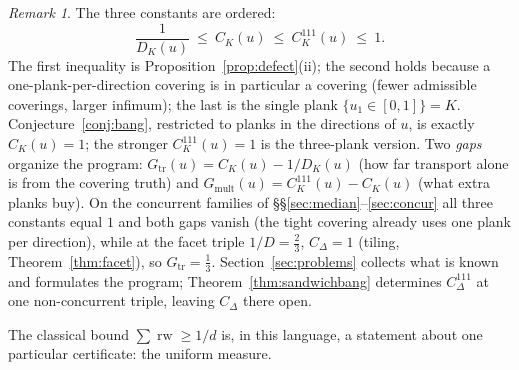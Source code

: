 \documentclass{aims}
\numberwithin{equation}{section}
\theoremstyle{plain}
\theoremstyle{definition}
\theoremstyle{remark}
\newtheorem{remark}[theorem]{Remark}
\newcommand{\rw}{\operatorname{rw}}
\begin{document}
\begin{remark}\label{rem:covconst}
The three constants are ordered:
\[
\frac1{D_K(u)}\ \le\ C_K(u)\ \le\ C^{111}_K(u)\ \le\ 1 .
\]
The first inequality is Proposition~\ref{prop:defect}(ii); the second holds
because a one-plank-per-direction covering is in particular a covering (fewer
admissible coverings, larger infimum); the last is the single plank
$\{u_1\in[0,1]\}=K$. Conjecture~\ref{conj:bang}, restricted to planks in the
directions of $u$, is exactly $C_K(u)=1$; the stronger $C^{111}_K(u)=1$ is the
three-plank version. Two \emph{gaps} organize the program:
$G_{\mathrm{tr}}(u)=C_K(u)-1/D_K(u)$ (how far transport alone is from the
covering truth) and $G_{\mathrm{mult}}(u)=C^{111}_K(u)-C_K(u)$ (what extra
planks buy). On the concurrent families of
\S\S\ref{sec:median}--\ref{sec:concur} all three constants equal $1$ and both
gaps vanish (the tight covering already uses one plank per direction), while at
the facet triple $1/D=\tfrac23$, $C_\Delta=1$ (tiling,
Theorem~\ref{thm:facet}), so $G_{\mathrm{tr}}=\tfrac13$.
Section~\ref{sec:problems} collects what is known and formulates the program;
Theorem~\ref{thm:sandwichbang} determines $C^{111}_\Delta$ at one
non-concurrent triple, leaving $C_\Delta$ there open.
\end{remark}

The classical bound $\sum\rw\ge1/d$ is, in this language, a statement about
one particular certificate: the uniform measure.
\end{document}
